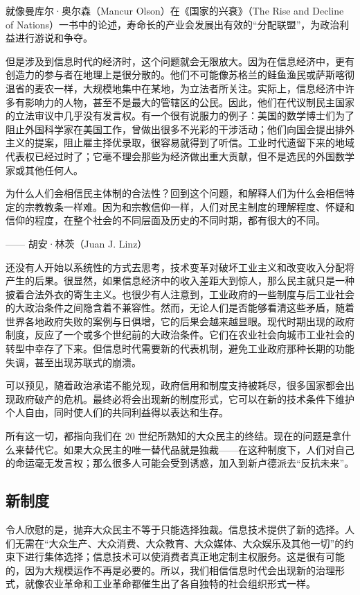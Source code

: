 就像曼库尔·奥尔森（Mancur Olson）在《国家的兴衰》（The Rise and Decline of Nations）一书中的论述，寿命长的产业会发展出有效的“分配联盟”，为政治利益进行游说和争夺。

但是涉及到信息时代的经济时，这个问题就会无限放大。因为在信息经济中，更有创造力的参与者在地理上是很分散的。他们不可能像苏格兰的鲑鱼渔民或萨斯喀彻温省的麦农一样，大规模地集中在某地，为立法者所关注。实际上，信息经济中许多有影响力的人物，甚至不是最大的管辖区的公民。因此，他们在代议制民主国家的立法审议中几乎没有发言权。有一个很有说服力的例子：美国的数学博士们为了阻止外国科学家在美国工作，曾做出很多不光彩的干涉活动；他们向国会提出排外主义的提案，阻止雇主择优录取，很容易就得到了听信。工业时代遗留下来的地域代表权已经过时了；它毫不理会那些为经济做出重大贡献，但不是选民的外国数学家或其他任何人。

\begin{tcolorbox}
\kaishu 为什么人们会相信民主体制的合法性？回到这个问题，和解释人们为什么会相信特定的宗教教条一样难。因为和宗教信仰一样，人们对民主制度的理解程度、怀疑和信仰的程度，在整个社会的不同层面及历史的不同时期，都有很大的不同。
\begin{flushright}
—— 胡安·林茨（Juan J. Linz）
\end{flushright}
\end{tcolorbox}

还没有人开始以系统性的方式去思考，技术变革对破坏工业主义和改变收入分配将产生的后果。很显然，如果信息经济中的收入差距大到惊人，那么民主就只是一种披着合法外衣的寄生主义。也很少有人注意到，工业政府的一些制度与后工业社会的大政治条件之间隐含着不兼容性。然而，无论人们是否能够看清这些矛盾，随着世界各地政府失败的案例与日俱增，它的后果会越来越显眼。现代时期出现的政府制度，反应了一个或多个世纪前的大政治条件。它们在农业社会向城市工业社会的转型中幸存了下来。但信息时代需要新的代表机制，避免工业政府那种长期的功能失调，甚至出现苏联式的崩溃。

可以预见，随着政治承诺不能兑现，政府信用和制度支持被耗尽，很多国家都会出现政府破产的危机。最终必将会出现新的制度形式，它可以在新的技术条件下维护个人自由，同时使人们的共同利益得以表达和生存。

所有这一切，都指向我们在 20 世纪所熟知的大众民主的终结。现在的问题是拿什么来替代它。如果大众民主的唯一替代品就是独裁——在这种制度下，人们对自己的命运毫无发言权；那么很多人可能会受到诱惑，加入到新卢德派去“反抗未来”。

\subsection{新制度}
令人欣慰的是，抛弃大众民主不等于只能选择独裁。信息技术提供了新的选择。人们无需在“大众生产、大众消费、大众教育、大众媒体、大众娱乐及其他一切”的约束下进行集体选择；信息技术可以使消费者真正地定制主权服务。这是很有可能的，因为大规模运作不再是必要的。所以，我们相信信息时代会出现新的治理形式，就像农业革命和工业革命都催生出了各自独特的社会组织形式一样。

